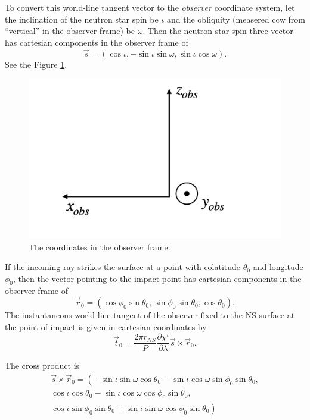 \documentclass[modern]{aastex631}
\begin{document}
To convert this world-line tangent vector to the \emph{observer} coordinate
system, let the inclination of the neutron star spin be $\iota$ and the
obliquity (measered ccw from ``vertical'' in the observer frame) be $\omega$.
Then the neutron star spin three-vector has cartesian components in the observer
frame of 
\begin{equation}
    \vec{s} = \left( \cos \iota, -\sin \iota \sin \omega, \sin \iota \cos \omega \right).
\end{equation}
See the Figure \ref{fig:obs_cart}.
\begin{figure}
    \centering
        \includegraphics[width=0.9\columnwidth]{obs_cart_coord.png}
        \caption{The coordinates in the observer frame.}
        \label{fig:obs_cart}
    \end{figure}
If the incoming ray strikes the surface at a point with colatitude $\theta_0$
and longitude $\phi_0$, then the vector pointing to the impact point has
cartesian components in the observer frame of 
\begin{equation}
    \vec{r}_0 = \left( \cos \phi_0 \sin \theta_0, \sin\phi_0 \sin \theta_0, \cos \theta_0 \right).
\end{equation}
The instantaneous world-line tangent of the observer fixed to the NS surface at
the point of impact is given in cartesian coordinates by
\begin{equation}
    \label{eq:tangent_vel}
    \vec{t}_0 = \frac{2 \pi r_{NS}}{P} \frac{\partial \chi^t}{\partial \lambda} \vec{s} \times \vec{r}_0. 
\end{equation}

The cross product is 
\begin{align*}
        \vec{s} \times \vec{r}_0 = \left(
        -\sin \iota \sin \omega \cos \theta_0 - \sin \iota \cos \omega \sin\phi_0 \sin \theta_0, \right. \\
        \left. \cos \iota \cos \theta_0 - \sin \iota \cos \omega \cos \phi_0 \sin \theta_0, \right. \\
        \left. \cos \iota \sin\phi_0 \sin \theta_0 + \sin \iota \sin \omega \cos \phi_0 \sin \theta_0 \right)
\end{align*}
    
\end{document}
